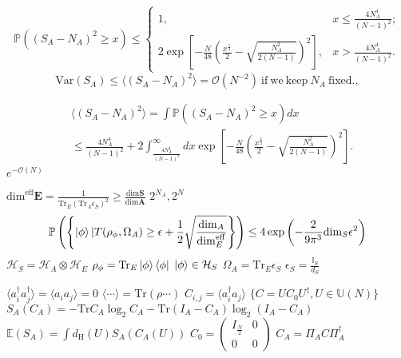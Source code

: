 \documentclass{beamer}
\begin{document}
\begin{frame}
   \[
\mathbb{P}((S_{A}-N_{A})^{2}\geq x)\leq\begin{cases}
1, & x\leq\frac{4N_{A}^{4}}{(N-1)^{2}};\\
2\exp\left[-\frac{N}{48}\left(\frac{x^{\frac{1}{4}}}{2}-\sqrt{\frac{N_{A}^{2}}{2(N-1)}}\right)^{2}\right], & x>\frac{4N_{A}^{4}}{(N-1)^{2}}.
\end{cases}
\]
\[
\mathrm{Var}(S_{A})\leq\langle(S_{A}-N_{A})^{2}\rangle=\mathcal{O}(N^{-2})\ \mathrm{if\ we\ keep}\ N_{A}\ \mathrm{fixed}.,
\]
\end{frame}
\begin{frame}
   \begin{align*}
&\langle(S_{A}-N_{A})^{2}\rangle =\int\mathbb{P}((S_{A}-N_{A})^{2}\geq x)dx\\
 & \leq\frac{4N_{A}^{4}}{(N-1)^{2}}+2\int_{\frac{4N_{A}^{4}}{(N-1)^{2}}}^{\infty}dx\exp\left[-\frac{N}{48}\left(\frac{x^{\frac{1}{4}}}{2}-\sqrt{\frac{N_{A}^{2}}{2(N-1)}}\right)^{2}\right].
\end{align*}
$e^{-\mathcal{O}(N)}$
\end{frame}
\begin{frame}
   $\mathrm{dim}^{\mathrm{eff}} \bm{E}=\frac{1}{\mathrm{Tr}_{E}(\mathrm{Tr}_{A}\epsilon_{S})^{2}}\geq\frac{\mathrm{dim} \bm{S}}{\mathrm{dim} \bm{A}}$
   $2^{N_A}, 2^N$
   \begin{equation*}
   \mathbb{P}\left(\left\{ \ket{\phi}|T(\rho_{\phi},\Omega_{A})\geq\epsilon+\frac{1}{2}\sqrt{\frac{\mathrm{dim}_{A}}{\mathrm{dim}_{E}^{\mathrm{eff}}}}\right\} \right)\leq4\exp{\left(-\frac{2}{9\pi^{3}}\mathrm{dim}_{S}\epsilon^{2}\right)}
   \end{equation*}
   $\mathcal{H}_S=\mathcal{H}_A\otimes\mathcal{H}_E$
   $\rho_{\phi}=\mathrm{Tr}_E\ket{\phi}\bra{\phi}$
   $\ket{\phi}\in\mathcal{H}_S$
   $\Omega_{A}=\mathrm{Tr}_E\epsilon_S$
   $\epsilon_S=\frac{\mathbb{I}_S}{d_S}$
\end{frame}
\begin{frame}
   $\langle a_{i}^{\dagger}a_{j}^{\dagger}\rangle=\langle a_{i}a_{j}\rangle=0$
    $\langle\cdots\rangle=\mathrm{Tr}(\rho\cdots)$
    $C_{i,j}=\langle a_i^\dag a_{j}\rangle$
    $\{C=UC_{0}U^{\dagger},U\in\mathbb{U}(N)\}$
    $S_{A}(C_{A})=-\mathrm{Tr} C_{A}\log_{2}C_{A}-\mathrm{Tr}(I_{A}-C_{A})\log_{2}(I_{A}-C_{A})$
    $\mathbb{E}(S_{A})=\int d_{\mathrm{H}}(U)S_{A}(C_{A}(U))$
$C_{0}=\begin{pmatrix}I_{\frac{N}{2}} & 0\\
0 & 0
\end{pmatrix}$
$C_{A}=\Pi_A C \Pi_A^{\dagger}$
\end{frame}
\end{document}
